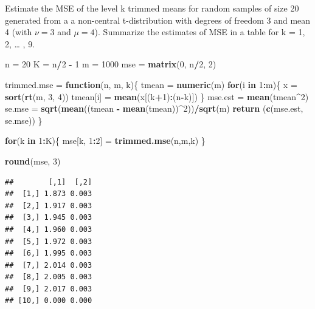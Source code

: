 \documentclass[
]{article}
\newenvironment{Shaded}{\begin{snugshade}}{\end{snugshade}}
\newcommand{\ControlFlowTok}[1]{\textcolor[rgb]{0.13,0.29,0.53}{\textbf{#1}}}
\newcommand{\DecValTok}[1]{\textcolor[rgb]{0.00,0.00,0.81}{#1}}
\newcommand{\KeywordTok}[1]{\textcolor[rgb]{0.13,0.29,0.53}{\textbf{#1}}}
\newcommand{\NormalTok}[1]{#1}
\newcommand{\OperatorTok}[1]{\textcolor[rgb]{0.81,0.36,0.00}{\textbf{#1}}}
\newcommand{\StringTok}[1]{\textcolor[rgb]{0.31,0.60,0.02}{#1}}
\begin{document}
Estimate the MSE of the level k trimmed means for random samples of size
20 generated from a a non-central t-distribution with degrees of freedom
3 and mean 4 (with \(\nu = 3\) and \(\mu=4\)). Summarize the estimates
of MSE in a table for k = 1, 2, \ldots{} , 9.

\begin{Shaded}
\begin{Highlighting}[]
\NormalTok{n =}\StringTok{ }\DecValTok{20}
\NormalTok{K =}\StringTok{ }\NormalTok{n}\OperatorTok{/}\DecValTok{2} \OperatorTok{-}\StringTok{ }\DecValTok{1}
\NormalTok{m =}\StringTok{ }\DecValTok{1000}
\NormalTok{mse =}\StringTok{ }\KeywordTok{matrix}\NormalTok{(}\DecValTok{0}\NormalTok{, n}\OperatorTok{/}\DecValTok{2}\NormalTok{, }\DecValTok{2}\NormalTok{)}

\NormalTok{trimmed.mse =}\StringTok{ }\ControlFlowTok{function}\NormalTok{(n, m, k)\{}
\NormalTok{  tmean =}\StringTok{ }\KeywordTok{numeric}\NormalTok{(m)}
  \ControlFlowTok{for}\NormalTok{(i }\ControlFlowTok{in} \DecValTok{1}\OperatorTok{:}\NormalTok{m)\{}
\NormalTok{    x =}\StringTok{ }\KeywordTok{sort}\NormalTok{(}\KeywordTok{rt}\NormalTok{(m, }\DecValTok{3}\NormalTok{, }\DecValTok{4}\NormalTok{))}
\NormalTok{    tmean[i] =}\StringTok{ }\KeywordTok{mean}\NormalTok{(x[(k}\OperatorTok{+}\DecValTok{1}\NormalTok{)}\OperatorTok{:}\NormalTok{(n}\OperatorTok{-}\NormalTok{k)])}
\NormalTok{  \}}
\NormalTok{  mse.est =}\StringTok{ }\KeywordTok{mean}\NormalTok{(tmean}\OperatorTok{^}\DecValTok{2}\NormalTok{)}
\NormalTok{  se.mse =}\StringTok{ }\KeywordTok{sqrt}\NormalTok{(}\KeywordTok{mean}\NormalTok{((tmean }\OperatorTok{-}\StringTok{ }\KeywordTok{mean}\NormalTok{(tmean))}\OperatorTok{^}\DecValTok{2}\NormalTok{))}\OperatorTok{/}\KeywordTok{sqrt}\NormalTok{(m)}
  \KeywordTok{return}\NormalTok{ (}\KeywordTok{c}\NormalTok{(mse.est, se.mse))}
\NormalTok{\}}

\ControlFlowTok{for}\NormalTok{(k }\ControlFlowTok{in} \DecValTok{1}\OperatorTok{:}\NormalTok{K)\{}
\NormalTok{  mse[k, }\DecValTok{1}\OperatorTok{:}\DecValTok{2}\NormalTok{] =}\StringTok{ }\KeywordTok{trimmed.mse}\NormalTok{(n,m,k)}
\NormalTok{\}}

\KeywordTok{round}\NormalTok{(mse, }\DecValTok{3}\NormalTok{)}
\end{Highlighting}
\end{Shaded}

\begin{verbatim}
##        [,1]  [,2]
##  [1,] 1.873 0.003
##  [2,] 1.917 0.003
##  [3,] 1.945 0.003
##  [4,] 1.960 0.003
##  [5,] 1.972 0.003
##  [6,] 1.995 0.003
##  [7,] 2.014 0.003
##  [8,] 2.005 0.003
##  [9,] 2.017 0.003
## [10,] 0.000 0.000
\end{verbatim}
\end{document}

